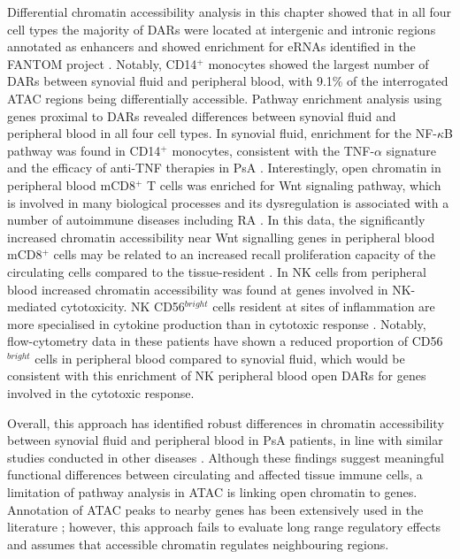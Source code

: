 Differential chromatin accessibility analysis in this chapter showed that in all four cell types the majority of DARs were located at intergenic and intronic regions annotated as enhancers and showed enrichment for eRNAs identified in the FANTOM project \parencite{FANTOM2014}. Notably, CD14$^+$ monocytes showed the largest number of DARs between synovial fluid and peripheral blood, with 9.1\% of the interrogated ATAC regions being differentially accessible. Pathway enrichment analysis using genes proximal to DARs revealed differences between synovial fluid and peripheral blood in all four cell types. In synovial fluid, enrichment for the NF-$\kappa$B pathway was found in CD14$^+$ monocytes, consistent with the TNF-$\alpha$ signature and the efficacy of anti-TNF therapies in PsA \parencite{Mahil2016}. Interestingly, open chromatin in peripheral blood mCD8$^+$ T cells was enriched for Wnt signaling pathway, which is involved in many biological processes and its dysregulation is associated with a number of autoimmune diseases including RA \parencite{Miao2013}. In this data, the significantly increased chromatin accessibility near Wnt signalling genes in peripheral blood mCD8$^+$ cells may be related to an increased recall proliferation capacity of the circulating cells compared to the tissue-resident \parencite{Boudousquie2014}. In NK cells from peripheral blood increased chromatin accessibility was found at genes involved in NK-mediated cytotoxicity. NK CD56$^{bright}$ cells resident at sites of inflammation are more specialised in cytokine production than in cytotoxic response \parencite{Michel2016}. Notably, flow-cytometry data in these patients have shown a reduced proportion of CD56$^{bright}$ cells in peripheral blood compared to synovial fluid, which would be consistent with this enrichment of NK peripheral blood open DARs for genes involved in the cytotoxic response.

Overall, this approach has identified robust differences in chromatin accessibility between synovial fluid and peripheral blood in PsA patients, in line with similar studies conducted in other diseases \parencite{Scharer2016,Wang2018,Corces2016}. Although these findings suggest meaningful functional differences between circulating and affected tissue immune cells, a limitation of pathway analysis in ATAC is linking open chromatin to genes. Annotation of ATAC peaks to nearby genes has been extensively used in the literature \parencite{Scharer2016,Ackermann2016, Corces2016, Wang2018}; however, this approach fails to evaluate long range regulatory effects and assumes that accessible chromatin regulates neighbouring regions. %
   

